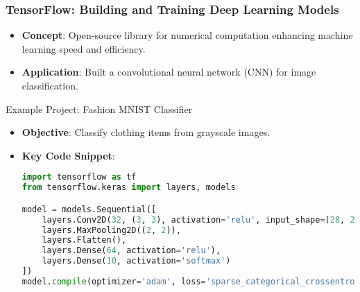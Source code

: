 \documentclass{beamer}
\begin{document}
\begin{frame}[fragile]
    \frametitle{TensorFlow: Building and Training Deep Learning Models}
    \begin{itemize}
        \item \textbf{Concept}: Open-source library for numerical computation enhancing machine learning speed and efficiency.
        \item \textbf{Application}: Built a convolutional neural network (CNN) for image classification.
    \end{itemize}

    \begin{block}{Example Project: Fashion MNIST Classifier}
        \begin{itemize}
            \item \textbf{Objective}: Classify clothing items from grayscale images.
            \item \textbf{Key Code Snippet}:
            \begin{lstlisting}[language=Python]
import tensorflow as tf
from tensorflow.keras import layers, models

model = models.Sequential([
    layers.Conv2D(32, (3, 3), activation='relu', input_shape=(28, 28, 1)),
    layers.MaxPooling2D((2, 2)),
    layers.Flatten(),
    layers.Dense(64, activation='relu'),
    layers.Dense(10, activation='softmax')
])
model.compile(optimizer='adam', loss='sparse_categorical_crossentropy', metrics=['accuracy'])
            \end{lstlisting}
        \end{itemize}
    \end{block}
\end{frame}
\end{document}

